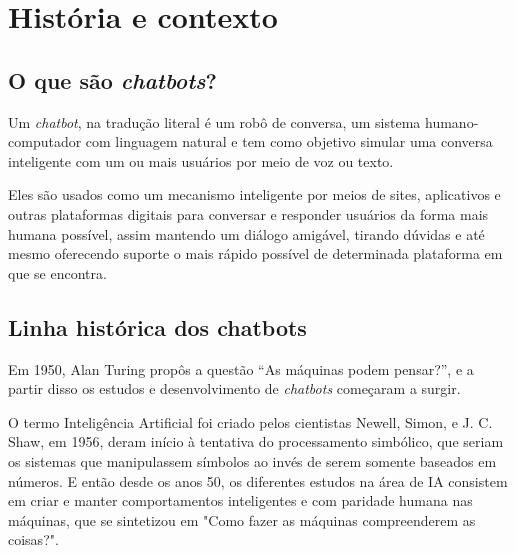 \documentclass[
	12pt,				%
	oneside,
	a4paper,			%
	english,			%
	french,				%
	spanish,			%
	brazil				%
	]{abntex2}
\begin{document}
\section{História e contexto}

\subsection{O que são \emph{chatbots}?}
Um \emph{chatbot}, na tradução literal é um robô de conversa, um sistema humano-computador com linguagem natural e tem como objetivo simular uma conversa inteligente com um ou mais usuários por meio de voz ou texto. 

Eles são usados como um mecanismo inteligente por meios de sites, aplicativos e outras plataformas digitais para conversar e responder usuários da forma mais humana possível, assim mantendo um diálogo amigável, tirando dúvidas e até mesmo oferecendo suporte o mais rápido possível de determinada plataforma em que se encontra.

\subsection{Linha histórica dos chatbots}
Em 1950, Alan Turing propôs a questão “As máquinas podem pensar?”, e a partir disso os estudos e desenvolvimento de \emph{chatbots} começaram a surgir.


O termo Inteligência Artificial foi criado pelos cientistas Newell, Simon, e J. C. Shaw, em 1956, deram início à tentativa do processamento simbólico, que seriam os sistemas que manipulassem símbolos ao invés de serem somente baseados em números.
E então desde os anos 50, os diferentes estudos na área de IA consistem em criar e manter comportamentos inteligentes e com paridade humana nas máquinas, que se sintetizou em "Como fazer as máquinas compreenderem as coisas?"\cite{minsky}.
\end{document}
